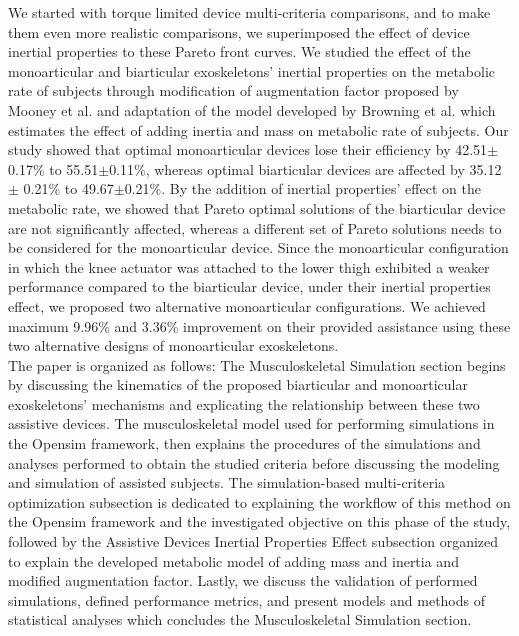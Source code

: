 \documentclass[10pt,letterpaper]{article}
\begin{document}
We started with torque limited device multi-criteria comparisons, and to make them even more realistic comparisons, we superimposed the effect of device inertial properties to these Pareto front curves. We studied the effect of the monoarticular and biarticular exoskeletons' inertial properties on the metabolic rate of subjects through modification of augmentation factor proposed by Mooney et al. \cite{41} and adaptation of the model developed by Browning et al. \cite{133} which estimates the effect of adding inertia and mass on metabolic rate of subjects. Our study showed that optimal monoarticular devices lose their efficiency by 42.51$\pm$0.17\% to 55.51$\pm$0.11\%, whereas optimal biarticular devices are affected by 35.12 $\pm$ 0.21\% to 49.67$\pm$0.21\%. By the addition of inertial properties' effect on the metabolic rate, we showed that Pareto optimal solutions of the biarticular device are not significantly affected, whereas a different set of Pareto solutions needs to be considered for the monoarticular device. Since the monoarticular configuration in which the knee actuator was attached to the lower thigh exhibited a weaker performance compared to the biarticular device, under their inertial properties effect, we proposed two alternative monoarticular configurations. We achieved maximum 9.96\% and 3.36\% improvement on their provided assistance using these two alternative designs of monoarticular exoskeletons.\\
The paper is organized as follows: The Musculoskeletal Simulation section begins by discussing the kinematics of the proposed biarticular and monoarticular exoskeletons' mechanisms and explicating the relationship between these two assistive devices. The musculoskeletal model used for performing simulations in the Opensim framework, then explains the procedures of the simulations and analyses performed to obtain the studied criteria before discussing the modeling and simulation of assisted subjects. The simulation-based multi-criteria optimization subsection is dedicated to explaining the workflow of this method on the Opensim framework and the investigated objective on this phase of the study, followed by the Assistive Devices Inertial Properties Effect subsection organized to explain the developed metabolic model of adding mass and inertia and modified augmentation factor. Lastly, we discuss the validation of performed simulations, defined performance metrics, and present models and methods of statistical analyses which concludes the Musculoskeletal Simulation section.\\
\end{document}

